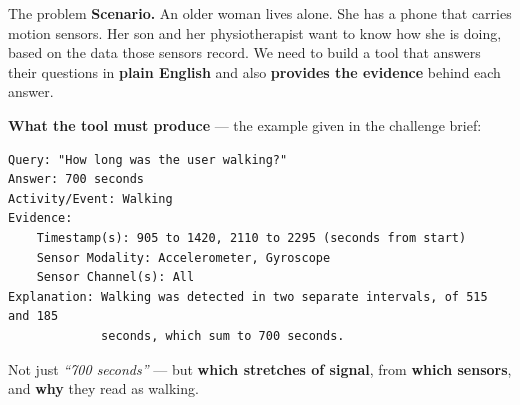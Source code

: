 \documentclass[aspectratio=169,11pt]{beamer}
\newcommand{\hilite}[1]{\textcolor{atsorange}{\textbf{#1}}}
\begin{document}
\begin{frame}[fragile]{The problem}
  \textbf{Scenario.}
  An older woman lives alone. She has a phone that carries motion sensors. Her
  son and her physiotherapist want to know how she is doing, based on the data
  those sensors record. We need to build a tool that answers their questions in
  \hilite{plain English} and also \hilite{provides the evidence} behind each
  answer.

  \medskip
  \textbf{What the tool must produce} --- the example given in the challenge
  brief:

  \smallskip
  \begin{center}
  \begin{minipage}{0.86\textwidth}
  \footnotesize
\begin{verbatim}
Query: "How long was the user walking?"
Answer: 700 seconds
Activity/Event: Walking
Evidence:
    Timestamp(s): 905 to 1420, 2110 to 2295 (seconds from start)
    Sensor Modality: Accelerometer, Gyroscope
    Sensor Channel(s): All
Explanation: Walking was detected in two separate intervals, of 515 and 185
             seconds, which sum to 700 seconds.
\end{verbatim}
  \end{minipage}
  \end{center}

  \smallskip
  \small
  Not just \emph{``700 seconds''} --- but \hilite{which stretches of signal},
  from \hilite{which sensors}, and \hilite{why} they read as walking.
\end{frame}
\end{document}
